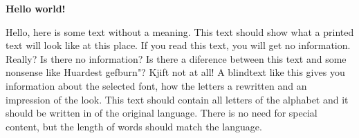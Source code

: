 \documentclass[../main.tex]{subfiles}
\begin{document}
\textbf{Hello world!}



Hello, here is some text without a meaning.  This text should show what a printed text will look like at this place.  If you read this text, you will get no information.  Really?  Is there no information?  Is there a diference between this text and some nonsense like Huardest gefburn"?  Kjift  not at all!  A blindtext like this gives you information about the selected font, how the letters a rewritten and an impression of the look.  This text should contain all letters of the alphabet and it should be written in of the original language.  There is no need for special content, but the length of words should match the language.
\end{document}
